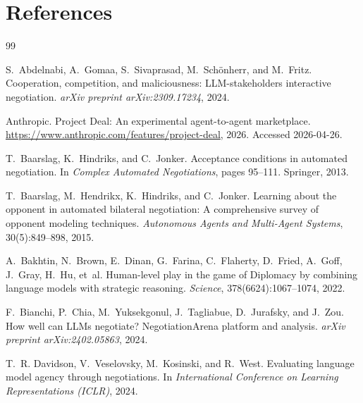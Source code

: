 \documentclass[11pt,a4paper]{article}
\begin{document}
\section*{References}
\begingroup
\renewcommand{\section}[2]{}
\begin{thebibliography}{99}

S.~Abdelnabi, A.~Gomaa, S.~Sivaprasad, M.~Sch{\"o}nherr, and M.~Fritz.
\newblock Cooperation, competition, and maliciousness: {LLM}-stakeholders interactive negotiation.
\newblock \emph{arXiv preprint arXiv:2309.17234}, 2024.

Anthropic.
\newblock Project {D}eal: An experimental agent-to-agent marketplace.
\newblock \url{https://www.anthropic.com/features/project-deal}, 2026.
\newblock Accessed 2026-04-26.

T.~Baarslag, K.~Hindriks, and C.~Jonker.
\newblock Acceptance conditions in automated negotiation.
\newblock In \emph{Complex Automated Negotiations}, pages 95--111. Springer, 2013.

T.~Baarslag, M.~Hendrikx, K.~Hindriks, and C.~Jonker.
\newblock Learning about the opponent in automated bilateral negotiation: A comprehensive survey of opponent modeling techniques.
\newblock \emph{Autonomous Agents and Multi-Agent Systems}, 30(5):849--898, 2015.

A.~Bakhtin, N.~Brown, E.~Dinan, G.~Farina, C.~Flaherty, D.~Fried, A.~Goff, J.~Gray, H.~Hu, et~al.
\newblock Human-level play in the game of {D}iplomacy by combining language models with strategic reasoning.
\newblock \emph{Science}, 378(6624):1067--1074, 2022.

F.~Bianchi, P.~Chia, M.~Yuksekgonul, J.~Tagliabue, D.~Jurafsky, and J.~Zou.
\newblock How well can {LLM}s negotiate? {NegotiationArena} platform and analysis.
\newblock \emph{arXiv preprint arXiv:2402.05863}, 2024.

T.~R. Davidson, V.~Veselovsky, M.~Kosinski, and R.~West.
\newblock Evaluating language model agency through negotiations.
\newblock In \emph{International Conference on Learning Representations (ICLR)}, 2024.


\end{thebibliography}
\end{document}
